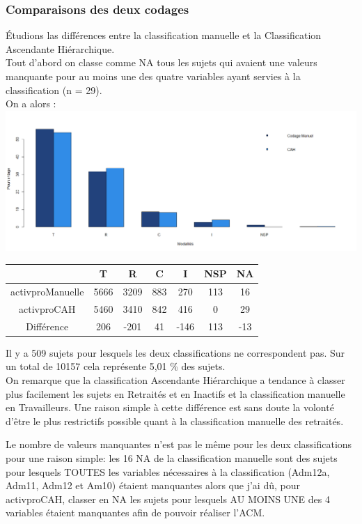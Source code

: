 \documentclass{book}
\begin{document}
\subsubsection{Comparaisons des deux codages}
\noindent
Étudions las différences entre la classification manuelle et la Classification Ascendante Hiérarchique.\\
Tout d'abord on classe comme NA tous les sujets qui avaient une valeurs manquante pour au moins une des quatre variables ayant servies à la classification (n = 29).\\
On a alors : \\

\includegraphics[scale=1]{comp_codages_activpro_pourcentage.png}

\begin{center}
\setlength\arrayrulewidth{.5pt}
\begin{tabular}{c|cccccc}

	& T & R & C & I & NSP & NA \\
	\hline
activproManuelle & 5666 & 3209 & 883 & 270 & 113 & 16 \\
activproCAH	 & 5460 & 3410 &  842 & 416 & 0 & 29 \\
\hline
\hline
Différence & 206 & -201 &  41 & -146& 113& -13
\end{tabular}
\end{center}

\noindent
Il y a 509 sujets pour lesquels les deux classifications ne correspondent pas. Sur un total de 10157 cela représente 5,01 \% des sujets.\\
On remarque que la classification Ascendante Hiérarchique a tendance à classer plus facilement les sujets en Retraités et en Inactifs et la classification manuelle en Travailleurs. Une raison simple à cette différence est sans doute la volonté d'être le plus restrictifs possible quant à la classification manuelle des retraités.

\noindent
Le nombre de valeurs manquantes n'est pas le même pour les deux classifications pour une raison simple: les 16 NA de la classification manuelle sont des sujets pour lesquels TOUTES les variables nécessaires à la classification (Adm12a, Adm11, Adm12 et Am10) étaient manquantes alors que j'ai dû, pour activproCAH, classer en NA les sujets pour lesquels AU MOINS UNE des 4 variables étaient manquantes afin de pouvoir réaliser l'ACM.
\end{document}
